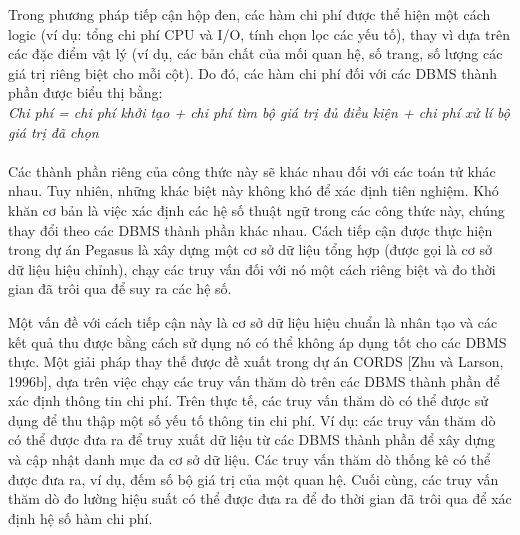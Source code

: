 \documentclass[a4paper]{article}
\begin{document}
Trong phương pháp tiếp cận hộp đen,
các hàm chi phí được thể hiện một cách logic (ví dụ: tổng chi phí CPU và I/O, tính chọn lọc
các yếu tố), thay vì dựa trên các đặc điểm vật lý (ví dụ, các bản chất của mối quan hệ,
số trang, số lượng các giá trị riêng biệt cho mỗi cột). Do đó, các hàm chi phí
đối với các DBMS thành phần được biểu thị bằng:
\\
\textit{Chi phí = chi phí khởi tạo + chi phí  tìm bộ giá trị đủ điều kiện + chi phí xử lí bộ giá trị đã chọn }
\\
\\
Các thành phần riêng của công thức này sẽ khác nhau đối với các toán tử khác nhau. Tuy nhiên, những khác biệt này không khó để xác định tiên nghiệm. Khó khăn cơ bản là việc xác định các hệ số thuật ngữ trong các công thức này, chúng thay đổi theo các DBMS thành phần khác nhau. Cách tiếp cận được thực hiện trong dự án Pegasus là xây dựng một cơ sở dữ liệu tổng hợp (được gọi là cơ sở dữ liệu hiệu chỉnh), chạy các truy vấn đối với nó một cách riêng biệt và đo thời gian đã trôi qua để suy ra các hệ số.


Một vấn đề với cách tiếp cận này là cơ sở dữ liệu hiệu chuẩn là nhân tạo và các kết quả thu được bằng cách sử dụng nó có thể không áp dụng tốt cho các DBMS thực. Một giải pháp thay thế được đề xuất trong dự án CORDS [Zhu và Larson, 1996b], dựa trên việc chạy các truy vấn thăm dò trên các DBMS thành phần để xác định thông tin chi phí. Trên thực tế, các truy vấn thăm dò có thể được sử dụng để thu thập một số yếu tố thông tin chi phí. Ví dụ: các truy vấn thăm dò có thể được đưa ra để truy xuất dữ liệu từ các DBMS thành phần để xây dựng và cập nhật danh mục đa cơ sở dữ liệu. Các truy vấn thăm dò thống kê có thể được đưa ra, ví dụ, đếm số bộ giá trị của một quan hệ. Cuối cùng, các truy vấn thăm dò đo lường hiệu suất có thể được đưa ra để đo thời gian đã trôi qua để xác định hệ số hàm chi phí.
\end{document}
